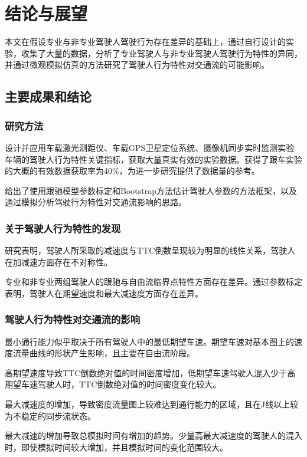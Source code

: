 \chapter{结论与展望}

本文在假设专业与非专业驾驶人驾驶行为存在差异的基础上，通过自行设计的实验，收集了大量的数据，分析了专业驾驶人与非专业驾驶人驾驶行为特性的异同，并通过微观模拟仿真的方法研究了驾驶人行为特性对交通流的可能影响。

\section{主要成果和结论}
\subsection{研究方法}
设计并应用车载激光测距仪、车载GPS卫星定位系统、摄像机同步实时监测实验车辆的驾驶人行为特性关键指标，获取大量真实有效的实验数据。获得了跟车实验的大概的有效数据获取率为40\%，为进一步研究提供了数据量的参考。

给出了使用跟驰模型参数标定和Bootstrap方法估计驾驶人参数的方法框架，以及通过模拟分析驾驶行为特性对交通流影响的思路。

\subsection{关于驾驶人行为特性的发现}
研究表明，驾驶人所采取的减速度与TTC倒数呈现较为明显的线性关系，驾驶人在加减速方面存在不对称性。

专业和非专业两组驾驶人的跟驰与自由流临界点特性方面存在差异。通过参数标定表明，驾驶人在期望速度和最大减速度方面存在差异。


\subsection{驾驶人行为特性对交通流的影响}

最小通行能力似乎取决于所有驾驶人中的最低期望车速。期望车速对基本图上的速度流量曲线的形状产生影响，且主要在自由流阶段。

高期望速度导致TTC倒数绝对值的时间密度增加，低期望车速驾驶人混入少于高期望车速驾驶人时，TTC倒数绝对值的时间密度变化较大。


最大减速度的增加，导致密度流量图上较难达到通行能力的区域，且在J线以上较为不稳定的同步流状态。

最大减速的增加导致总模拟时间有增加的趋势。少量高最大减速度的驾驶人的混入时，即使模拟时间较大增加，并且模拟时间的变化范围较大。

